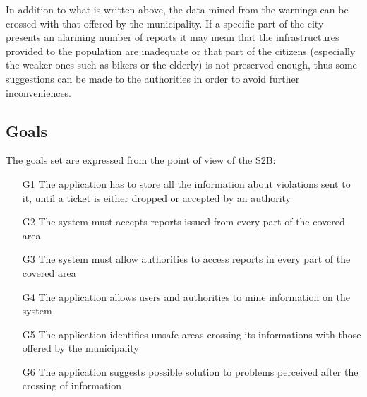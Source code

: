 In addition to what is written above, the data mined from the warnings can be crossed with that offered by the municipality. If a specific part of the city presents an alarming number of reports it may mean that the infrastructures provided to the population are inadequate or that part of the citizens (especially the weaker ones such as bikers or the elderly) is not preserved enough, thus some suggestions can be made to the authorities in order to avoid further inconveniences.

\subsection{Goals}

The goals set are expressed from the point of view of the S2B:

\begin{itemize}


\item [G1]{The application has to store all the information about violations sent to it, until a ticket is either dropped or accepted by an authority}

\item [G2]{The system must accepts reports issued from every part of the covered area }

\item [G3]{The system must allow authorities to access reports in every part of the covered area}

\item [G4]{The application allows users and authorities to mine information on the system}

\item [G5]{The application identifies unsafe areas crossing its informations with those offered by the municipality}

\item [G6]{The application suggests possible solution to problems perceived after the crossing of information}

\end{itemize}